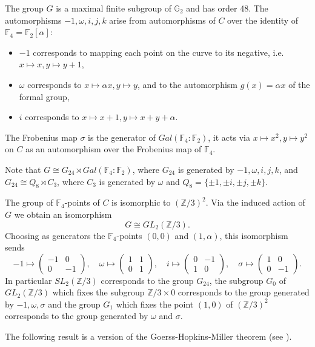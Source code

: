 \documentclass{amsart}
\newcommand {\F}{{\mathbb F}}
\newcommand {\Z}{{\mathbb Z}}
\newcommand {\G}{{\mathbb G}}
\numberwithin{equation}{section}
\theoremstyle{definition}  %
\newtheorem{set theory}[thm]{Set Theoretic Prelude}
\begin{document}
The group $G$ is a maximal finite subgroup of $\G_2$ and has order 48. 
The automorphisms  $-1,\omega,i,j,k$ arise from automorphisms of $C$ over the identity of $\F_4=\F_2[\alpha]$:
\begin{itemize}
\item $-1$ corresponds to mapping each point on the curve to its negative, i.e. $x\mapsto x,y\mapsto y+1$,
\item $\omega$ corresponds to $x\mapsto \alpha x,y\mapsto y$, and to the automorphism $g(x)=\alpha x$ of the formal group,
\item $i$ corresponds to $x\mapsto x+1, y\mapsto x+y+\alpha$.
\end{itemize}
The Frobenius map $\sigma$ is the generator of $Gal(\F_4:\F_2)$, it acts via $x\mapsto x^2, y\mapsto y^2$ on $C$
as an automorphism over the Frobenius map of $\F_4$.
 
Note that $G\cong G_{24}\rtimes Gal(\F_4:\F_2)$, where $G_{24}$ is generated by $-1,\omega,i,j,k$,
and  $G_{24}\cong Q_8\rtimes C_3$, where $C_3$ is generated by $\omega$ and $Q_8=\{\pm 1,\pm i,\pm j, \pm k\}$.

The group of $\F_4$-points of $C$ is isomorphic to $(\Z/3)^2$. Via the induced action of $G$ we obtain an isomorphism
$$G\cong GL_2(\Z/3).$$ 
Choosing as generators the $\F_4$-points $(0,0)$ and $(1,\alpha)$, this isomorphism sends
$$-1\mapsto \begin{pmatrix}-1 &0\\0&-1 \end{pmatrix},\quad \omega\mapsto \begin{pmatrix}1 &1\\0&1 \end{pmatrix},\quad i\mapsto \begin{pmatrix}0 &-1\\1&0 \end{pmatrix}, 
\quad \sigma\mapsto  \begin{pmatrix}1 &0\\0&-1 \end{pmatrix}.$$
In particular $SL_2(\Z/3)$ corresponds to the group $G_{24}$, the subgroup $G_0$ of $GL_2(\Z/3)$ which fixes the subgroup $\Z/3\times 0$ corresponds to the group generated by $-1,\omega, \sigma$ and 
the group $G_1$ which fixes the point $(1,0)$ of $(\Z/3)^2$ corresponds to the group generated by $\omega$ and $\sigma$.

The following result is a version of the Goerss-Hopkins-Miller theorem (see \cite[Chapter 12]{MR3223024}).
\end{document}
